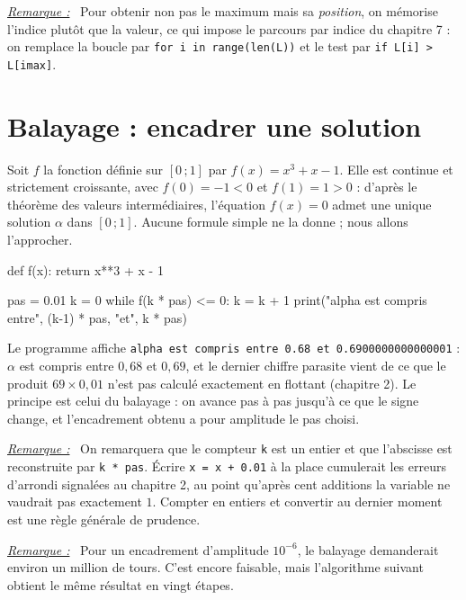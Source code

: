 \documentclass[a4paper,11pt,openany]{book}
\newcommand{\code}[1]{\texttt{\textcolor{codebleu}{#1}}}
\newenvironment{remarque}%
 {\par\vspace{1mm}\begin{list}{}{\leftmargin=1cm \rightmargin=0.5cm}\item[]%
  \textit{\underline{Remarque :}}~}%
 {\end{list}\vspace{1mm}}
\begin{document}
\begin{remarque}
Pour obtenir non pas le maximum mais sa \emph{position}, on mémorise l'indice plutôt que la valeur, ce qui impose le parcours par indice du chapitre 7 : on remplace la boucle par \code{for i in range(len(L))} et le test par \code{if L[i] > L[imax]}.
\end{remarque}

\section{Balayage : encadrer une solution}

Soit $f$ la fonction définie sur $[0\,;1]$ par $f(x) = x^3 + x - 1$. Elle est continue et strictement croissante, avec $f(0) = -1 < 0$ et $f(1) = 1 > 0$ : d'après le théorème des valeurs intermédiaires, l'équation $f(x) = 0$ admet une unique solution $\alpha$ dans $[0\,;1]$. Aucune formule simple ne la donne ; nous allons l'approcher.

\begin{python}
def f(x):
    return x**3 + x - 1

pas = 0.01
k = 0
while f(k * pas) <= 0:
    k = k + 1
print("alpha est compris entre", (k-1) * pas, "et", k * pas)
\end{python}

Le programme affiche \code{alpha est compris entre 0.68 et 0.6900000000000001} : $\alpha$ est compris entre $0{,}68$ et $0{,}69$, et le dernier chiffre parasite vient de ce que le produit $69 \times 0{,}01$ n'est pas calculé exactement en flottant (chapitre 2). Le principe est celui du balayage : on avance pas à pas jusqu'à ce que le signe change, et l'encadrement obtenu a pour amplitude le pas choisi.

\begin{remarque}
On remarquera que le compteur \code{k} est un entier et que l'abscisse est reconstruite par \code{k * pas}. Écrire \code{x = x + 0.01} à la place cumulerait les erreurs d'arrondi signalées au chapitre 2, au point qu'après cent additions la variable ne vaudrait pas exactement $1$. Compter en entiers et convertir au dernier moment est une règle générale de prudence.
\end{remarque}

\begin{remarque}
Pour un encadrement d'amplitude $10^{-6}$, le balayage demanderait environ un million de tours. C'est encore faisable, mais l'algorithme suivant obtient le même résultat en vingt étapes.
\end{remarque}
\end{document}
